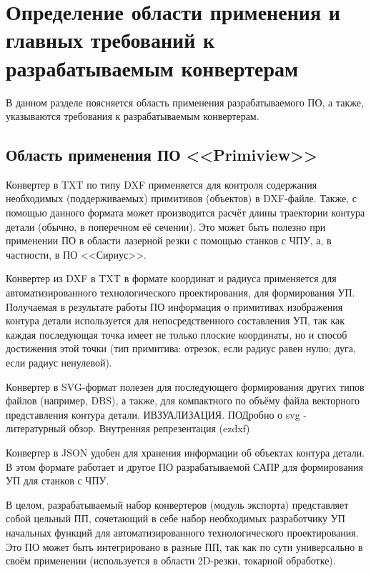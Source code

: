 \chapter{Определение области применения и главных требований к разрабатываемым конвертерам}
\label{cha:analysis}
%
%
В данном разделе поясняется область применения разрабатываемого ПО, а также, указываются требования к разрабатываемым конвертерам.

\section{Область применения ПО <<Primiview>>}

Конвертер в TXT по типу DXF применяется для контроля содержания необходимых (поддерживаемых) примитивов (объектов) в DXF-файле. Также, с помощью данного формата может производится расчёт длины траектории  контура детали (обычно, в поперечном её сечении). Это может быть полезно при применении ПО в области лазерной резки с помощью станков с ЧПУ, а, в частности, в ПО <<Сириус>>.

Конвертер из DXF в TXT в формате координат и радиуса применяется для автоматизированного технологического проектирования, для формирования УП. Получаемая в результате работы ПО информация о примитивах изображения контура детали используется для непосредственного составления УП, так как каждая последующая точка имеет не только плоские координаты, но и способ достижения этой точки (тип примитива: отрезок, если радиус равен нулю; дуга, если радиус ненулевой).

Конвертер в SVG-формат полезен для последующего формирования других типов файлов (например, DBS), а также, для компактного по объёму файла векторного представления контура детали. ИВЗУАЛИЗАЦИЯ. ПОДробно о svg - литературный обзор. Внутренняя репрезентация (ezdxf)

Конвертер в JSON удобен для хранения информации об объектах контура детали. В этом формате работает и другое ПО разрабатываемой САПР для формирования УП для станков с ЧПУ.

В целом, разрабатываемый набор конвертеров (модуль экспорта) представляет собой цельный ПП, сочетающий в себе набор необходимых разработчику УП начальных функций для автоматизированного технологического проектирования. Это ПО может быть интегрировано в разные ПП, так как по сути универсально в своём применении (используется в области 2D-резки, токарной обработке).




